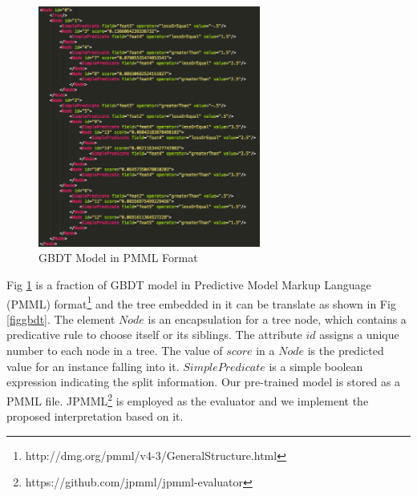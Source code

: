 % 
\begin{figure}[th]
 \centering
 \includegraphics[width=0.65\textwidth]{pic/pmml.png}
    \caption{GBDT Model in PMML Format }\label{figpmml}
\end{figure}
Fig \ref{figpmml} is a fraction of GBDT model in Predictive Model Markup Language (PMML) format\footnote{http://dmg.org/pmml/v4-3/GeneralStructure.html}
and the tree embedded in it can be
 translate as shown in Fig \ref{figgbdt}. 
The element $Node$  is an encapsulation for a 
 tree node, which contains a predicative rule to choose itself or its siblings. The attribute $id$ 
 assigns a unique number to each node in a tree. The value of $score$ in a $Node$ is the 
 predicted value for an instance falling into it. $SimplePredicate$ is a simple boolean expression 
 indicating the split information. Our pre-trained model is stored as a PMML file. 
 JPMML\footnote{https://github.com/jpmml/jpmml-evaluator} is employed as the evaluator and
 we implement the proposed interpretation based on it.
 
